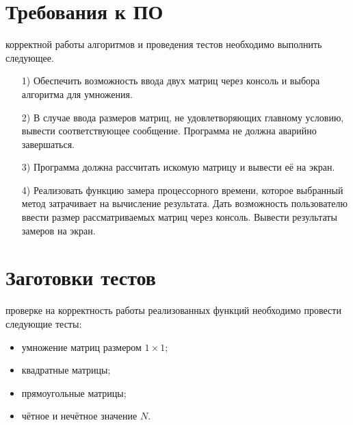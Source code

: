 \section{Требования к ПО}
 корректной работы алгоритмов и проведения тестов необходимо выполнить следующее.
\begin{enumerate}
	\item[1)]Обеспечить возможность ввода двух матриц через консоль и выбора алгоритма для умножения.
	\item[2)]В случае ввода размеров матриц, не удовлетворяющих главному условию, вывести соответствующее сообщение. Программа не должна аварийно завершаться.
	\item[3)]Программа должна рассчитать искомую матрицу и вывести её на экран.
	\item[4)]Реализовать функцию замера процессорного времени, которое выбранный метод затрачивает на вычисление результата. Дать возможность пользователю ввести размер рассматриваемых матриц через консоль. Вывести результаты замеров на экран.
\end{enumerate}


\section{Заготовки тестов}
 проверке на корректность работы реализованных функций необходимо провести следующие тесты:
\begin{itemize}
	\item умножение матриц размером $1 \times 1$;
	\item квадратные матрицы;
	\item прямоугольные матрицы;
	\item чётное и нечётное значение $N$.
\end{itemize}